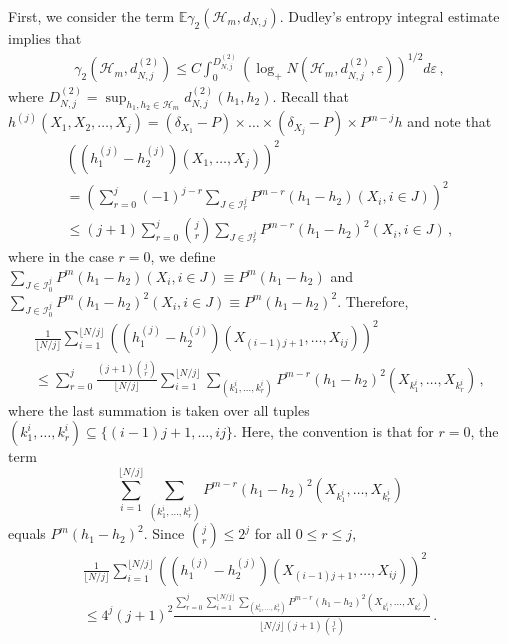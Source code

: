 \documentclass[12pt]{article}
\def\l{\left}
\def\r{\right}
\newcommand{\mb}{\mathbb}
\newcommand{\scolor}[1]{\textcolor{red}{#1}} %
\theoremstyle{thmstyletwo}%
\theoremstyle{thmstylethree}%
\begin{document}
First, we consider the term $\mb E \gamma_2(\mathcal{H}_m, d_{N,j})$. Dudley's entropy integral estimate \citep{talagrand2014upper} implies that
\begin{align*}
    \gamma_{2} \l(\mathcal{H}_m, d^{(2)}_{N,j}\r)\leq C \int_0^{D^{(2)}_{N,j}} \l(\log_+ N(\mathcal{H}_m, d^{(2)}_{N,j}, \varepsilon) \r)^{1/2} d\varepsilon \,,
\end{align*}
where $D^{(2)}_{N,j} = \sup_{h_1, h_2 \in \mathcal{H}_m} d_{N,j}^{(2)}(h_1, h_2)$. Recall that $h^{(j)}(X_1, X_2, \ldots, X_j) = (\delta_{X_1} - P) \times \ldots \times (\delta_{X_j} - P) \times P^{m-j}h$ and note that
\begin{multline}\label{eq:decompose_h^j_distance}
    \l(\l(h_1^{(j)} - h_2^{(j)}\r)(X_1, \ldots, X_j)\r)^2 
    \\=  \l( \sum_{r=0}^j (-1)^{j-r}\sum_{J \in \mathcal{I}^j_r}  P^{m-r}(h_1 - h_2)(X_i, i \in J)\r)^2 \\
    \leq   (j+1) \sum_{r=0}^j  {j \choose r} \sum_{J \in \mathcal{I}^j_r} P^{m-r}(h_1 - h_2)^2(X_i, i \in J)\,,
\end{multline}
where in the case $r=0$, we define $\sum_{J \in \mathcal{I}^j_0} P^m (h_1 - h_2)(X_i, i \in J) \equiv P^m(h_1 - h_2)$ and $\sum_{J \in \mathcal{I}^j_0} P^m (h_1 - h_2)^2(X_i, i \in J) \equiv P^m(h_1 - h_2)^2$. Therefore,
\begin{multline*}
    \frac{1}{\lfloor N/j \rfloor} \sum_{i=1}^{\lfloor N/j \rfloor} \l(\l(h_1^{(j)} - h_2^{(j)}\r)\l(X_{(i-1)j + 1}, \ldots,X_{ij}\r)\r)^2 \\ 
    \leq \sum_{r=0}^j \frac{(j+1){j \choose r}}{\lfloor N/j \rfloor}\sum_{i=1}^{\lfloor N/j \rfloor}\sum_{(k^i_1, \ldots, k^i_r)} P^{m-r}(h_1-h_2)^2(X_{k^i_1}, \ldots, X_{k^i_r}) \,,
\end{multline*}
where the last summation is taken over all 
tuples $(k^i_1, \ldots, k^i_r) \subseteq \{(i-1)j + 1, \ldots, ij\}$. Here, the convention is that for $r = 0$, the term 
\[
\sum_{i=1}^{\lfloor N/j \rfloor}\sum_{(k^i_1, \ldots, k^i_r)} P^{m-r}(h_1-h_2)^2(X_{k^i_1}, \ldots, X_{k^i_r})
\]
equals $P^{m}(h_1-h_2)^2$. Since ${j \choose r} \leq 2^j$ for all $0 \leq r \leq j$,
\begin{multline}\label{eq:decompose_h^j_distance-2}
    \frac{1}{\lfloor N/j \rfloor} \sum_{i=1}^{\lfloor N/j \rfloor} \l(\l(h_1^{(j)} - h_2^{(j)}\r)\l(X_{(i-1)j + 1}, \ldots,X_{ij}\r)\r)^2 \\
    \leq 4^j(j+1)^2 \frac{\sum_{r=0}^j \sum_{i=1}^{\lfloor N/j \rfloor}\sum_{(k^i_1, \ldots, k^i_r)} P^{m-r}(h_1-h_2)^2(X_{k^i_1}, \ldots, X_{k^i_r})}{\lfloor N/j \rfloor (j+1) {j \choose r}}\,.
\end{multline}
\end{document}
